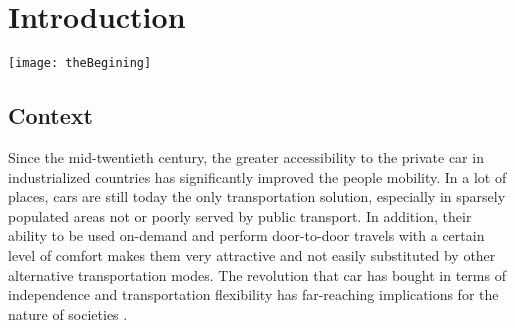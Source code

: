 \chapter{Introduction} \label{chap:introduction}
\begin{bibunit}[ieeetr]
\minitoc
\vspace{2cm}
%
\noindent
\begin{minipage}[c]{0.45\textwidth}
\texttt{[image: theBegining]}
\end{minipage}
\hfill
\begin{minipage}[c]{0.45\textwidth}
\begin{abstract}
\end{abstract}
\end{minipage}

\newpage
\section{Context}
Since the mid-twentieth century, the greater accessibility to the private car in industrialized countries has significantly improved the people mobility.
In a lot of places, cars are still today the only transportation solution, especially in sparsely populated areas not or poorly served by public transport.
In addition, their ability to be used on-demand and perform door-to-door travels with a certain level of comfort makes them very attractive and not easily substituted by other alternative transportation modes.
The revolution that car has bought in terms of independence and transportation flexibility has far-reaching implications for the nature of societies \cite{jakle_lots_2004}.


\end{bibunit}
